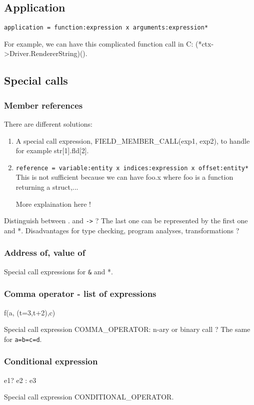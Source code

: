 \documentclass[a4paper]{article}
\begin{document}
\subsection{Application}
\verb/application = function:expression x arguments:expression*/

For example, we can have this complicated function call in C: (*ctx->Driver.RendererString)().
\subsection{Special calls }

\subsubsection{Member references }

There are different solutions:
\begin{enumerate}
\item A special call expression, FIELD\_MEMBER\_CALL(exp1, exp2), to handle for example
str[1].fld[2]. 
\item \verb/reference = variable:entity x indices:expression x offset:entity*/ 
This is not sufficient because we can have foo.x where foo is a function
returning a struct,... 

More explaination here !
\end{enumerate}
 Distinguish between . and \verb/->/ ? The last one can be represented by
 the first one and *. 
 Disadvantages for type checking, program
analyses, transformations ?

\subsubsection{Address of, value of}
Special call expressions for \verb/&/ and *.

\subsubsection{Comma operator - list of expressions}
f(a, (t=3,t+2),c)

Special call expression COMMA\_OPERATOR: n-ary or binary call ?
The same for \verb/a=b=c=d/. 

\subsubsection{Conditional expression}
e1? e2 : e3 

Special call expression CONDITIONAL\_OPERATOR.
\end{document}
